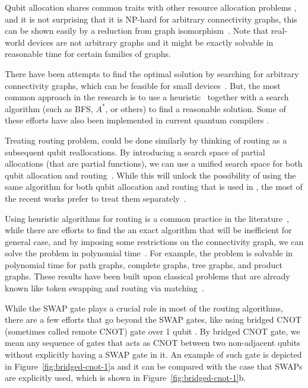 Qubit allocation shares common traits with other resource allocation problems \cite{alicherry2012},\cite[pp. 440-444]{allen2001} and it is not surprising that it is NP-hard for arbitrary connectivity graphs, this can be shown easily by a reduction from graph isomorphism~\cite{siraichi2018}. Note that real-world devices are not arbitrary graphs and it might be exactly solvable in reasonable time for certain families of graphs.

There have been attempts to find the optimal solution by searching for arbitrary connectivity graphs, which can be feasible for small devices~\cite{siraichi2018}. But, the most common approach in the research is to use a heuristic~\cite{zhang2021, itoko2019, cowtan2019,paler2019, murali2019} together with a search algorithm (such as BFS, $A^*$\cite{zulehner2018}, or others\cite{li2019}) to find a reasonable solution. Some of these efforts have also been implemented in current quantum compilers \cite{qiskit2023,sivarajah2021}.

Treating routing problem, could be done similarly by thinking of routing as a subsequent qubit reallocations. By introducing a search space of partial allocations (that are partial functions), we can use a unified search space for both qubit allocation and routing~\cite{zulehner2018,childs}. While this will unlock the possibility of using the same algorithm for both qubit allocation and routing that is used in \cite{zulehner2018}, the most of the recent works prefer to treat them separately~\cite{li2019,lao2021,childs}.

Using heuristic algorithms for routing is a common practice in the literature~\cite{zulehner2018, itoko2019, cowtan2019, li2019}, while there are efforts to find the an exact algorithm \cite{itoko2019} that will be inefficient for general case, and by imposing some restrictions on the connectivity graph, we can solve the problem in polynomial time~\cite{childs}. For example, the problem is solvable in polynomial time for path graphs, complete graphs, tree graphs, and product graphs. These results have been built upon classical problems that are already known like token swapping and routing via matching~\cite{banerjee2017}.

While the SWAP gate plays a crucial role in most of the routing algorithms, there are a few efforts that go beyond the SWAP gates, like using bridged CNOT (sometimes called remote CNOT) gate over 1 qubit \cite{itoko2019,siraichi2018,sivarajah2021}. By bridged CNOT gate, we mean any sequence of gates that acts as CNOT between two non-adjacent qubits without explicitly having a SWAP gate in it. An example of such gate is depicted in Figure~\ref{fig:bridged-cnot-1}a and it can be compared with the case that SWAPs are explicitly used, which is shown in Figure~\ref{fig:bridged-cnot-1}b.

